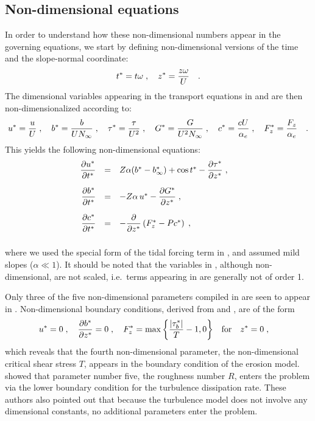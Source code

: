 \subsection{Non-dimensional equations}

In order to understand how these non-dimensional numbers appear in the
governing equations, we start by defining non-dimensional versions of
the time and the slope-normal coordinate:
\begin{equation}
  \label{tznd}
  t^\ast = t \omega \; , \quad  z^\ast = \frac{z \omega}{U} \quad .
\end{equation}
The dimensional variables appearing in the transport equations in
 and  are then non-dimensionalized according to:
\begin{equation}
  \label{paramnd}
  u^\ast = \frac{u}{U}\; , \quad b^\ast = \frac{b}{U N_\infty}\; , \quad
  \tau^\ast = \frac{\tau}{U^2}\; , \quad G^\ast = \frac{G}{U^2 N_\infty}     \; , \quad 
   c^\ast = \frac{cU}{\alpha_e} \; , \quad F_z^\ast = \frac{F_z}{\alpha_e}  \quad .
\end{equation}
This yields the following non-dimensional equations:
\begin{equation}
  \label{eqs_nondim}
  \begin{array}{rcl}
     \dfrac{\partial {u^\ast}}{\partial {t^\ast}}
    &=& 
    Z \alpha (b^\ast-b_\infty^\ast)  + \cos t^\ast
    - \dfrac{\partial {\tau^\ast}}{\partial {z^\ast}}                   \; , \quad  \\[5mm]
     \dfrac{\partial {b^\ast}}{\partial {t^\ast}}
    &=& 
      - Z \alpha \,  u^\ast- \dfrac{\partial {G^\ast}}{\partial {z^\ast}}                  
                      \; , \quad \\[5mm]
      \dfrac{\partial {c^\ast}}{\partial {t^\ast}} 
     &=& - \dfrac{\partial {}}{\partial {z^\ast}}\left( F_z^\ast
     - P c^\ast \right)          \; , \quad \\[5mm]
  \end{array}
\end{equation}
where we used the special form of the tidal forcing term in
, and assumed mild slopes ($\alpha \ll 1$). It should be
noted that the variables in , although non-dimensional,
are not scaled, i.e.\ terms appearing in  are generally
not of order 1.

Only three of the five non-dimensional parameters compiled in 
are seen to appear in . Non-dimensional boundary
conditions, derived from  and , are of the form
\begin{equation}
  \label{bc_nondim}
  u^\ast = 0 \; , \quad \dfrac{\partial {b^\ast}}{\partial {z^\ast}} = 0 \; , \quad F_z^\ast =
  \max{ \left\{ \dfrac{\left| \tau_b^\ast \right|}{T}-1,0 \right\} } \quad \text{for} \quad 
z^\ast=0
  \; , \quad
\end{equation}
which reveals that the fourth non-dimensional parameter, the
non-dimensional critical shear stress $T$, appears in the boundary
condition of the erosion model. \cite{UmlaufBurchard2011a} showed that
parameter number five, the roughness number $R$, enters the problem
via the lower boundary condition for the turbulence dissipation
rate. These authors also pointed out that because the
turbulence model does not involve any dimensional constants, no
additional parameters enter the problem.

